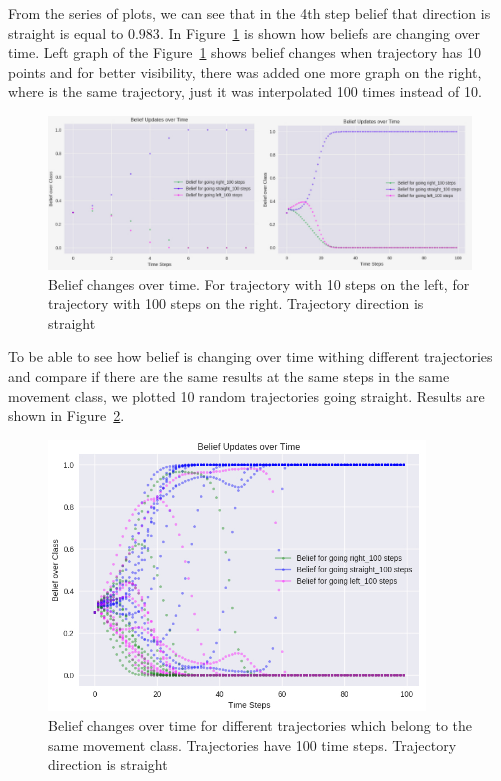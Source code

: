From the series of plots, we can see that in the 4th step belief that direction is straight is equal to $0.983$. In Figure~\ref{fig:CompareStraight} is shown how beliefs are changing over time. Left graph of the Figure~\ref{fig:CompareStraight} shows belief changes when trajectory has 10 points and for better visibility, there was added one more graph on the right, where is the same trajectory, just it was interpolated 100 times instead of 10.

\begin{figure}[h]
	\centering  	
	\includegraphics[width=15cm]{img/10_100_compared_straight.jpg}
	\caption{Belief changes over time. For trajectory with 10 steps on the left, for trajectory with 100 steps on the right. Trajectory direction is straight}
	\label{fig:CompareStraight}    
\end{figure}

To be able to see how belief is changing over time withing different trajectories and compare if there are the same results at the same steps in the same movement class, we plotted 10 random trajectories going straight. Results are shown in Figure~\ref{fig:10Straight}.

\begin{figure}[h]
	\centering  	
	\includegraphics[width=10cm]{img/10_straights.jpg}
	\caption{Belief changes over time for different trajectories which belong to the same movement class. Trajectories have 100 time steps. Trajectory direction is straight}
	\label{fig:10Straight}    
\end{figure}

